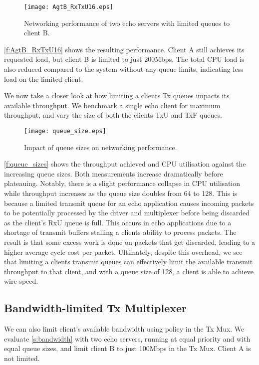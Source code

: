 \begin{figure}[h]
    \centering
    \texttt{[image: AgtB\_RxTxU16.eps]}
    \caption{Networking performance of two echo servers with limited queues to client B.}
    \label{f:AgtB_RxTxU16}
\end{figure}

\autoref{f:AgtB_RxTxU16} shows the resulting performance. Client A still achieves its requested load, but client B is limited
to just 200Mbps. The total CPU load is also reduced compared to the system without any queue limits, indicating less load on 
the limited client.

We now take a closer look at how limiting a clients Tx queues impacts its available throughput. We benchmark a single 
echo client for maximum throughput, and vary the size of both the clients TxU and TxF queues. 

\begin{figure}[h]
    \centering
    \texttt{[image: queue\_size.eps]}
    \caption{Impact of queue sizes on networking performance.}
    \label{f:queue_sizes}
\end{figure}

\autoref{f:queue_sizes} shows the throughput achieved and CPU utilisation against the increasing queue sizes. Both 
measurements increase dramatically before plateauing. Notably, there is a slight performance collapse in CPU utilisation 
while throughput increases as the queue size doubles from 64 to 128. This is because a limited transmit queue
for an echo application causes incoming packets to be potentially processed by the driver and multiplexer before 
being discarded as the client's RxU queue is full.
This occurs in echo applications due to a shortage of transmit buffers stalling a clients ability to process packets. The
result is that some excess work is done on packets that get discarded, leading to a higher average cycle cost per packet. 
Ultimately, despite this overhead, we see that limiting a clients transmit queues can effectively limit the available transmit
throughput to that client, and with a queue size of 128, a client is able to achieve wire speed.\\

\subsection{Bandwidth-limited Tx Multiplexer}

We can also limit client's available bandwidth using policy in the Tx Mux. We evaluate \autoref{s:bandwidth} with two echo servers,
running at equal priority and with equal queue sizes, and limit client B to just 100Mbps in the Tx Mux. Client A is not limited.

